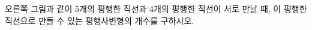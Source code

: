 \noindent\begin{minipage}[t]{0.58\linewidth}\vspace{0pt}\raggedright 오른쪽 그림과 같이 5개의 평행한 직선과 4개의 평행한 직선이 서로 만날 때, 이 평행한 직선으로 만들 수 있는 평행사변형의 개수를 구하시오.\end{minipage}\hfill\begin{minipage}[t]{0.4\linewidth}\vspace{0pt}\centering \resizebox{\ifdim\width>\linewidth\linewidth\else\width\fi}{!}{}\end{minipage}\par

